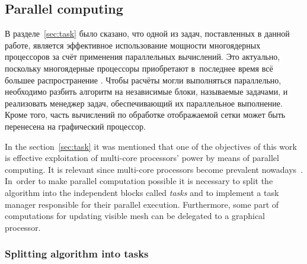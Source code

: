 \documentclass[a4paper, 12pt, titlepage]{extarticle}
\begin{document}
    \subsection{Parallel computing}\label{ssec:parallel}

\begin{original}
      В разделе~\ref{sec:task} было сказано, что одной из задач, поставленных в данной работе, является эффективное использование
      мощности многоядерных процессоров за счёт применения параллельных вычислений.
      Это актуально, поскольку многоядерные процессоры
      приобретают в~последнее время всё большее распространение \cite{steam-hardware}.
      Чтобы расчёты могли выполняться параллельно, необходимо разбить алгоритм на независимые
      блоки, называемые задачами, и реализовать менеджер задач, обеспечивающий их параллельное
      выполнение. Кроме того, часть вычислений по обработке отображаемой сетки может быть перенесена
      на графический процессор.
\end{original}

      In the section~\ref{sec:task} it was mentioned that one of the objectives of this work is
      effective exploitation of multi-core processors' power by means of parallel computing.
      It is relevant since multi-core processors become prevalent nowadays~\cite{steam-hardware}.
      In~order to make parallel computation possible it is necessary to split the algorithm into the
      independent blocks called \emph{tasks} and to implement a task manager responsible for their
      parallel execution. Furthermore, some part of computations for updating visible mesh can be
      delegated to a graphical processor.

      \subsubsection{Splitting algorithm into tasks}\label{sssec:parallel_tasks}
\end{document}
